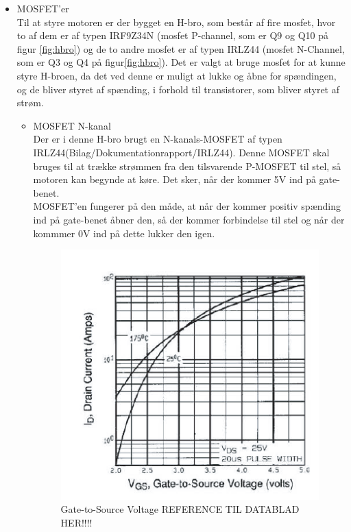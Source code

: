 \begin{itemize}
\item MOSFET'er \\
Til at styre motoren er der bygget en H-bro, som består af fire mosfet, hvor to af dem er af typen IRF9Z34N (mosfet P-channel, som er Q9 og Q10 på figur \ref{fig:hbro}) og de to andre mosfet er af typen IRLZ44 (mosfet N-Channel, som er Q3 og Q4 på figur\ref{fig:hbro}). Det er valgt at bruge mosfet for at kunne styre H-broen, da det ved denne er muligt at lukke og åbne for spændingen, og de bliver styret af spænding, i forhold til transistorer, som bliver styret af strøm. 

\begin{itemize}
\item MOSFET N-kanal \\
	Der er i denne H-bro brugt en N-kanals-MOSFET af typen IRLZ44(Bilag/Dokumentationrapport/IRLZ44). Denne MOSFET skal bruges til at trække strømmen fra den tilsvarende P-MOSFET til stel, så motoren kan begynde at køre. Det sker, når der kommer 5V ind på gate-benet. 
	\\MOSFET'en fungerer på den måde, at når der kommer positiv spænding ind på gate-benet åbner den, så der kommer forbindelse til stel og når der kommmer 0V ind på dette lukker den igen. 
	
	\begin{figure}[H]
		\centering
		\includegraphics[width=\textwidth]{DesignOgImplementering/images/grafn}
		\caption{Gate-to-Source Voltage REFERENCE TIL DATABLAD HER!!!!}
		\label{fig:mosfetn}
	\end{figure}
	

\end{itemize}
\end{itemize}
